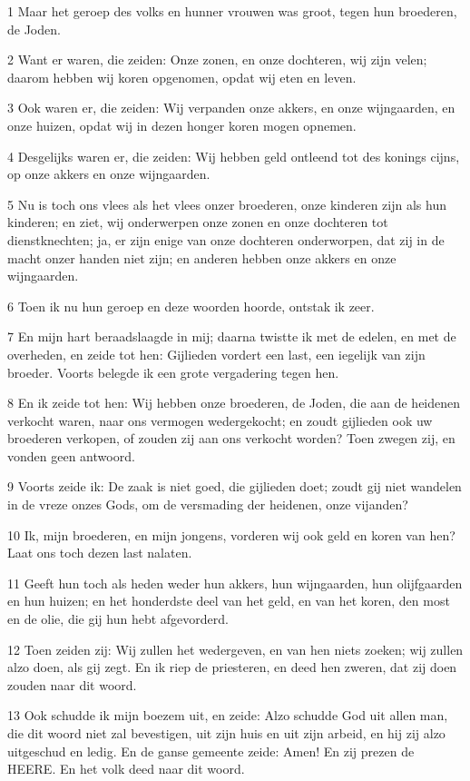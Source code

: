 \par 1 Maar het geroep des volks en hunner vrouwen was groot, tegen hun broederen, de Joden.
\par 2 Want er waren, die zeiden: Onze zonen, en onze dochteren, wij zijn velen; daarom hebben wij koren opgenomen, opdat wij eten en leven.
\par 3 Ook waren er, die zeiden: Wij verpanden onze akkers, en onze wijngaarden, en onze huizen, opdat wij in dezen honger koren mogen opnemen.
\par 4 Desgelijks waren er, die zeiden: Wij hebben geld ontleend tot des konings cijns, op onze akkers en onze wijngaarden.
\par 5 Nu is toch ons vlees als het vlees onzer broederen, onze kinderen zijn als hun kinderen; en ziet, wij onderwerpen onze zonen en onze dochteren tot dienstknechten; ja, er zijn enige van onze dochteren onderworpen, dat zij in de macht onzer handen niet zijn; en anderen hebben onze akkers en onze wijngaarden.
\par 6 Toen ik nu hun geroep en deze woorden hoorde, ontstak ik zeer.
\par 7 En mijn hart beraadslaagde in mij; daarna twistte ik met de edelen, en met de overheden, en zeide tot hen: Gijlieden vordert een last, een iegelijk van zijn broeder. Voorts belegde ik een grote vergadering tegen hen.
\par 8 En ik zeide tot hen: Wij hebben onze broederen, de Joden, die aan de heidenen verkocht waren, naar ons vermogen wedergekocht; en zoudt gijlieden ook uw broederen verkopen, of zouden zij aan ons verkocht worden? Toen zwegen zij, en vonden geen antwoord.
\par 9 Voorts zeide ik: De zaak is niet goed, die gijlieden doet; zoudt gij niet wandelen in de vreze onzes Gods, om de versmading der heidenen, onze vijanden?
\par 10 Ik, mijn broederen, en mijn jongens, vorderen wij ook geld en koren van hen? Laat ons toch dezen last nalaten.
\par 11 Geeft hun toch als heden weder hun akkers, hun wijngaarden, hun olijfgaarden en hun huizen; en het honderdste deel van het geld, en van het koren, den most en de olie, die gij hun hebt afgevorderd.
\par 12 Toen zeiden zij: Wij zullen het wedergeven, en van hen niets zoeken; wij zullen alzo doen, als gij zegt. En ik riep de priesteren, en deed hen zweren, dat zij doen zouden naar dit woord.
\par 13 Ook schudde ik mijn boezem uit, en zeide: Alzo schudde God uit allen man, die dit woord niet zal bevestigen, uit zijn huis en uit zijn arbeid, en hij zij alzo uitgeschud en ledig. En de ganse gemeente zeide: Amen! En zij prezen de HEERE. En het volk deed naar dit woord.
